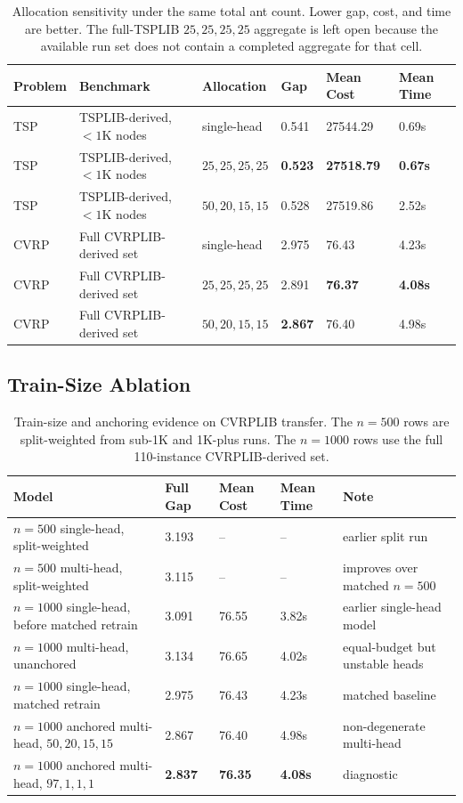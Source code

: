 \documentclass[11pt]{article}
\newcommand{\TSP}{\textsc{TSP}}
\newcommand{\CVRP}{\textsc{CVRP}}
\newcommand{\toprule}{\hline}
\newcommand{\midrule}{\hline}
\newcommand{\bottomrule}{\hline}
\begin{document}
\begin{table}[t]
\centering
\caption{Allocation sensitivity under the same total ant count. Lower gap, cost, and time are better. The full-TSPLIB $25,25,25,25$ aggregate is left open because the available run set does not contain a completed aggregate for that cell.}
\label{tab:allocation-sensitivity}
\small
\begin{tabularx}{\textwidth}{llYYYY}
\toprule
Problem & Benchmark & Allocation & Gap & Mean Cost & Mean Time \\
\midrule
\TSP{} & TSPLIB-derived, $<1$K nodes & single-head & 0.541 & 27544.29 & 0.69s \\
\TSP{} & TSPLIB-derived, $<1$K nodes & $25,25,25,25$ & \textbf{0.523} & \textbf{27518.79} & \textbf{0.67s} \\
\TSP{} & TSPLIB-derived, $<1$K nodes & $50,20,15,15$ & 0.528 & 27519.86 & 2.52s \\
\midrule
\CVRP{} & Full CVRPLIB-derived set & single-head & 2.975 & 76.43 & 4.23s \\
\CVRP{} & Full CVRPLIB-derived set & $25,25,25,25$ & 2.891 & \textbf{76.37} & \textbf{4.08s} \\
\CVRP{} & Full CVRPLIB-derived set & $50,20,15,15$ & \textbf{2.867} & 76.40 & 4.98s \\
\bottomrule
\end{tabularx}
\end{table}

\subsection{Train-Size Ablation}
\label{sec:train-size}

\begin{table}[t]
\centering
\caption{Train-size and anchoring evidence on CVRPLIB transfer. The $n=500$ rows are split-weighted from sub-1K and 1K-plus runs. The $n=1000$ rows use the full 110-instance CVRPLIB-derived set.}
\label{tab:cvrp-trainsize}
\small
\begin{tabularx}{\textwidth}{lYYYY}
\toprule
Model & Full Gap & Mean Cost & Mean Time & Note \\
\midrule
$n=500$ single-head, split-weighted & 3.193 & -- & -- & earlier split run \\
$n=500$ multi-head, split-weighted & 3.115 & -- & -- & improves over matched $n=500$ \\
$n=1000$ single-head, before matched retrain & 3.091 & 76.55 & 3.82s & earlier single-head model \\
$n=1000$ multi-head, unanchored & 3.134 & 76.65 & 4.02s & equal-budget but unstable heads \\
$n=1000$ single-head, matched retrain & 2.975 & 76.43 & 4.23s & matched baseline \\
$n=1000$ anchored multi-head, $50,20,15,15$ & 2.867 & 76.40 & 4.98s & non-degenerate multi-head \\
$n=1000$ anchored multi-head, $97,1,1,1$ & \textbf{2.837} & \textbf{76.35} & \textbf{4.08s} & diagnostic \\
\bottomrule
\end{tabularx}
\end{table}
\end{document}
